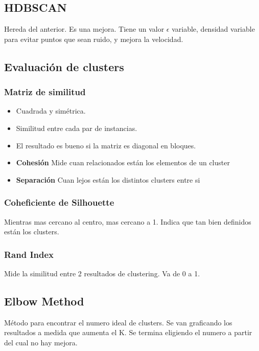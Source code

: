 \documentclass[titlepage,a4paper]{article}
\begin{document}
\subsection{HDBSCAN}
Hereda del anterior. Es una mejora. Tiene un valor $\epsilon$ variable, densidad variable para evitar puntos que sean ruido, y mejora la velocidad.

\subsection{Evaluación de clusters}

\subsubsection{Matriz de similitud}

\begin{itemize}
    \item Cuadrada y simétrica.
    \item Similitud entre cada par de instancias.
    \item El resultado es bueno si la matriz es diagonal en bloques.
    \item \textbf{Cohesión} Mide cuan relacionados están los elementos de un cluster
    \item \textbf{Separación} Cuan lejos están los distintos clusters entre si %
\end{itemize}

\subsubsection{Coheficiente de Silhouette}
Mientras mas cercano al centro, mas cercano a 1. Indica que tan bien definidos están los clusters.



\subsubsection{Rand Index}

Mide la similitud entre 2 resultados de clustering. Va de 0 a 1.


\subsection{Elbow Method}
Método para encontrar el numero ideal de clusters. Se van graficando los resultados a medida que aumenta el K. Se termina eligiendo el numero a partir del cual no hay mejora.
\end{document}
